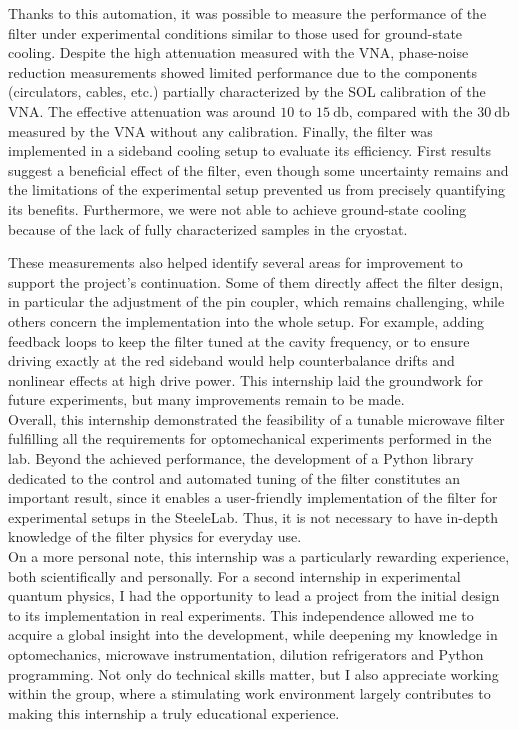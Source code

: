 \documentclass[11pt,a4pape,longbibliography]{article}
\begin{document}
Thanks to this automation, it was possible to measure the performance of the filter under experimental conditions similar to those used for ground-state cooling. Despite the high attenuation measured with the VNA, phase-noise reduction measurements showed limited performance due to the components (circulators, cables, etc.) partially characterized by the SOL calibration of the VNA. The effective attenuation was around $10$ to $\SI{15}{\decibel}$, compared with the $\SI{30}{\decibel}$ measured by the VNA without any calibration. Finally, the filter was implemented in a sideband cooling setup to evaluate its efficiency. First results suggest a beneficial effect of the filter, even though some uncertainty remains and the limitations of the experimental setup prevented us from precisely quantifying its benefits. Furthermore, we were not able to achieve ground-state cooling because of the lack of fully characterized samples in the cryostat.

These measurements also helped identify several areas for improvement to support the project's continuation. Some of them directly affect the filter design, in particular the adjustment of the pin coupler, which remains challenging, while others concern the implementation into the whole setup. For example, adding feedback loops to keep the filter tuned at the cavity frequency, or to ensure driving exactly at the red sideband would help counterbalance drifts and nonlinear effects at high drive power. This internship laid the groundwork for future experiments, but many improvements remain to be made.\\

Overall, this internship demonstrated the feasibility of a tunable microwave filter fulfilling all the requirements for optomechanical experiments performed in the lab. Beyond the achieved performance, the development of a Python library dedicated to the control and automated tuning of the filter constitutes an important result, since it enables a user-friendly implementation of the filter for experimental setups in the SteeleLab. Thus, it is not necessary to have in-depth knowledge of the filter physics for everyday use.\\

On a more personal note, this internship was a particularly rewarding experience, both scientifically and personally. For a second internship in experimental quantum physics, I had the opportunity to lead a project from the initial design to its implementation in real experiments. This independence allowed me to acquire a global insight into the development, while deepening my knowledge in optomechanics, microwave instrumentation, dilution refrigerators and Python programming. Not only do technical skills matter, but I also appreciate working within the group, where a stimulating work environment largely contributes to making this internship a truly educational experience.
\end{document}
